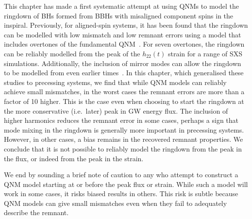 This chapter has made a first systematic attempt at using QNMs to model the ringdown of BHs formed from BBHs with misaligned component spins in the inspiral.
Previously, for aligned-spin systems, it has been found that the ringdown can be modelled with low mismatch and low remnant errors using a model that includes overtones of the fundamental QNM~\cite{Giesler:2019uxc}. 
For seven overtones, the ringdown can be reliably modelled from the peak of the $h_{22}(t)$ strain for a range of SXS simulations.
Additionally, the inclusion of mirror modes can allow the ringdown to be modelled from even earlier times~\cite{Dhani:2020nik}.
In this chapter, which generalised these studies to precessing systems, we find that while QNM models can reliably achieve small mismatches, in the worst cases the remnant errors are more than a factor of 10 higher.
This is the case even when choosing to start the ringdown at the more conservative (i.e.\ later) peak in GW energy flux. 
The inclusion of higher harmonics reduces the remnant error in some cases, perhaps a sign that mode mixing in the ringdown is generally more important in precessing systems. However, in other cases, a bias remains in the recovered remnant properties.
We conclude that it is not possible to reliably model the ringdown from the peak in the flux, or indeed from the peak in the strain. 

We end by sounding a brief note of caution to any who attempt to construct a QNM model starting at or before the peak flux or strain. 
While such a model will work in some cases, it risks biased results in others. 
This risk is subtle because QNM models can give small mismatches even when they fail to adequately describe the remnant.




